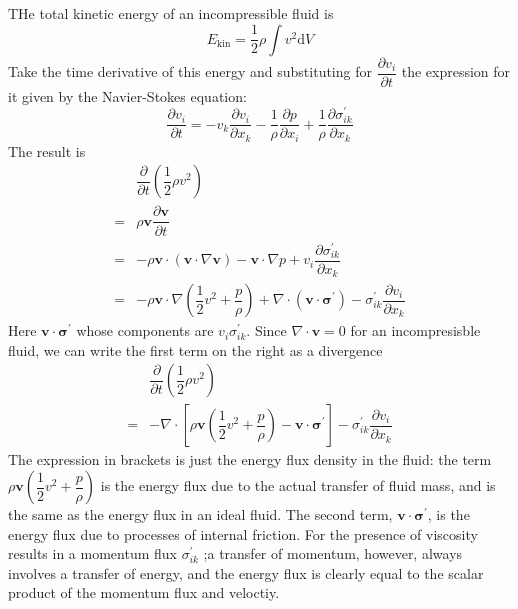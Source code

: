 \documentclass[conference]{IEEEtran}
\theoremstyle{definition}
\theoremstyle{remark}
\begin{document}
    THe total kinetic energy of an incompressible fluid is
    \[
        E_{\text{kin}} = \dfrac12 \rho \int v^2 \mathrm{d} V
    \]
    Take the time derivative of this energy and substituting for $\dfrac{\partial v_i}{\partial t}$ the expression for it given by the Navier-Stokes equation:
    \begin{equation*}
        \dfrac{\partial v_i}{\partial t} = -v_k \dfrac{\partial v_i}{\partial x_k} - \dfrac1\rho \dfrac{\partial p}{\partial x_i} + \dfrac1\rho \dfrac{\partial \sigma^\prime_{ik}}{\partial x_k}
    \end{equation*}
    The result is
    \begin{align*}
        & \dfrac{\partial}{\partial t} \left( \dfrac12 \rho v^2 \right) \\
        =& \rho \mathbf{v} \dfrac{\partial \mathbf{v}}{\partial t} \\
        =& -\rho \mathbf{v} \cdot (\mathbf{v} \cdot \nabla \mathbf{v}) - \mathbf{v} \cdot \nabla p + v_i \dfrac{\partial \sigma^\prime_{ik}}{\partial x_k} \\
        =& -\rho \mathbf{v} \cdot \nabla \left(\dfrac12 v^2 + \dfrac{p}{\rho} \right) + \nabla \cdot (\mathbf{v} \cdot \boldsymbol{\sigma}^\prime) - \sigma_{ik}^\prime \dfrac{\partial v_i}{\partial x_k}
    \end{align*}
    Here $\mathbf{v} \cdot \boldsymbol{\sigma}^\prime$ whose components are $v_i \sigma^\prime_{ik}$. Since $\nabla \cdot \mathbf{v} = 0$ for an incompresisble fluid, we can write the first term on the right as a divergence
    \begin{align*}
        & \dfrac{\partial}{\partial t} (\dfrac12 \rho v^2) \\
        =& -\nabla \cdot \left[ \rho \mathbf{v} \left( \dfrac12v^2 + \dfrac{p}{\rho} \right) - \mathbf{v} \cdot \boldsymbol{\sigma}^\prime \right] - \sigma_{ik}^\prime \dfrac{\partial v_i}{\partial x_k}
    \end{align*}
    The expression in brackets is just the energy flux density in the fluid: the term $\rho \mathbf{v} (\dfrac12 v^2 + \dfrac{p}{\rho})$ is the energy flux due to the actual transfer of fluid mass, and is the same as the energy flux in an ideal fluid. The second term, $\mathbf{v} \cdot \boldsymbol{\sigma}^\prime$, is the energy flux due to processes of internal friction. For the presence of viscosity results in a momentum flux $\sigma_{ik}^\prime$ ;a transfer of momentum, however, always involves a transfer of energy, and the energy flux is clearly equal to the scalar product of the momentum flux and veloctiy.
\end{document}
